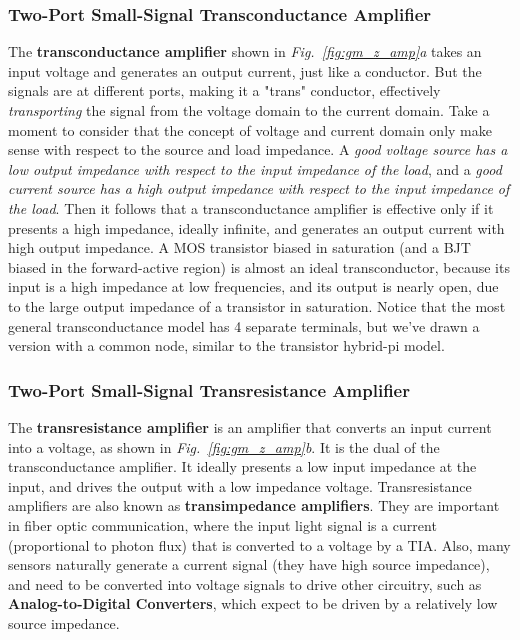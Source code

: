\subsubsection{Two-Port Small-Signal Transconductance Amplifier}
The \textbf{transconductance amplifier} shown in \emph{Fig.~\ref{fig:gm_z_amp}a} takes an input voltage and generates an output current, just like a conductor.  But the signals are at different ports, making it a "trans" conductor, effectively \emph{transporting} the signal from the voltage domain to the current domain.  Take a moment to consider that the concept of voltage and current domain only make sense with respect to the source and load impedance.  A \textit{good voltage source has a low output impedance with respect to the input impedance of the load}, and a \textit{good current source has a high output impedance with respect to the input impedance of the load}.  Then it follows that a transconductance amplifier is effective only if it presents a high impedance, ideally infinite, and generates an output current with high output impedance.  A MOS transistor biased in saturation (and a BJT biased in the forward-active region) is almost an ideal transconductor, because its input is a high impedance at low frequencies, and its output is nearly open, due to the large output impedance of a transistor in saturation.  Notice that the most general transconductance model has 4 separate terminals, but we've drawn a version with a common node, similar to the transistor hybrid-pi model. 
\subsubsection{Two-Port Small-Signal Transresistance Amplifier}
The \textbf{transresistance amplifier} is an amplifier that converts an input current into a voltage, as shown in \emph{Fig.~\ref{fig:gm_z_amp}b}.  It is the dual of the transconductance amplifier.  It ideally presents a low input impedance at the input, and drives the output with a low impedance voltage.  Transresistance amplifiers are also known as \textbf{transimpedance amplifiers}.  They are important in fiber optic communication, where the input light signal is a current (proportional to photon flux) that is converted to a voltage by a TIA.  Also, many sensors naturally generate a current signal (they have high source impedance), and need to be converted into voltage signals to drive other circuitry, such as \textbf{Analog-to-Digital Converters}, which expect to be driven by a relatively low source impedance.  
